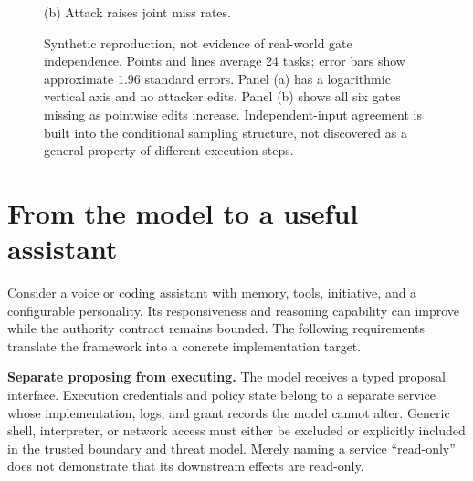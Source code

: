 \documentclass[10pt,twocolumn,letterpaper]{article}
\newcommand{\para}[1]{\smallskip\noindent\textbf{#1}\enspace}
\begin{document}
\begin{figure}[t]
\begin{minipage}{.49\textwidth}
\par\vspace{2pt}
{\small (b) Attack raises joint miss rates.}
\end{minipage}
\caption{Synthetic reproduction, not evidence of real-world gate independence. Points and lines average 24 tasks; error bars show approximate $1.96$ standard errors. Panel (a) has a logarithmic vertical axis and no attacker edits. Panel (b) shows all six gates missing as pointwise edits increase. Independent-input agreement is built into the conditional sampling structure, not discovered as a general property of different execution steps.}
\label{fig:monitors}
\end{figure}


\section{From the model to a useful assistant}
\label{sec:implementation}

Consider a voice or coding assistant with memory, tools, initiative, and a configurable personality. Its responsiveness and reasoning capability can improve while the authority contract remains bounded. The following requirements translate the framework into a concrete implementation target.

\para{Separate proposing from executing.} The model receives a typed proposal interface. Execution credentials and policy state belong to a separate service whose implementation, logs, and grant records the model cannot alter. Generic shell, interpreter, or network access must either be excluded or explicitly included in the trusted boundary and threat model. Merely naming a service ``read-only'' does not demonstrate that its downstream effects are read-only.
\end{document}
